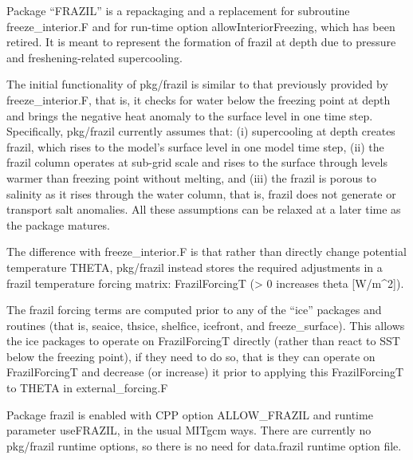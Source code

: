 
Package ``FRAZIL'' is a repackaging and a replacement for subroutine
freeze_interior.F and for run-time option allowInteriorFreezing, which has
been retired.  It is meant to represent the formation of frazil at depth due
to pressure and freshening-related supercooling.

The initial functionality of pkg/frazil is similar to that previously provided
by freeze_interior.F, that is, it checks for water below the freezing point at
depth and brings the negative heat anomaly to the surface level in one time
step.  Specifically, pkg/frazil currently assumes that: (i) supercooling at
depth creates frazil, which rises to the model's surface level in one model
time step, (ii) the frazil column operates at sub-grid scale and rises to the
surface through levels warmer than freezing point without melting, and (iii)
the frazil is porous to salinity as it rises through the water column, that
is, frazil does not generate or transport salt anomalies.  All these
assumptions can be relaxed at a later time as the package matures.

The difference with freeze_interior.F is that rather than directly change
potential temperature THETA, pkg/frazil instead stores the required
adjustments in a frazil temperature forcing matrix:
FrazilForcingT (> 0 increases theta [W/m^2]).

The frazil forcing terms are computed prior to any of the ``ice'' packages and
routines (that is, seaice, thsice, shelfice, icefront, and freeze_surface).
This allows the ice packages to operate on FrazilForcingT directly (rather
than react to SST below the freezing point), if they need to do so, that is
they can operate on FrazilForcingT and decrease (or increase) it prior to
applying this FrazilForcingT to THETA in external_forcing.F

Package frazil is enabled with CPP option ALLOW_FRAZIL and runtime parameter
useFRAZIL, in the usual MITgcm ways.  There are currently no pkg/frazil
runtime options, so there is no need for data.frazil runtime option file.
